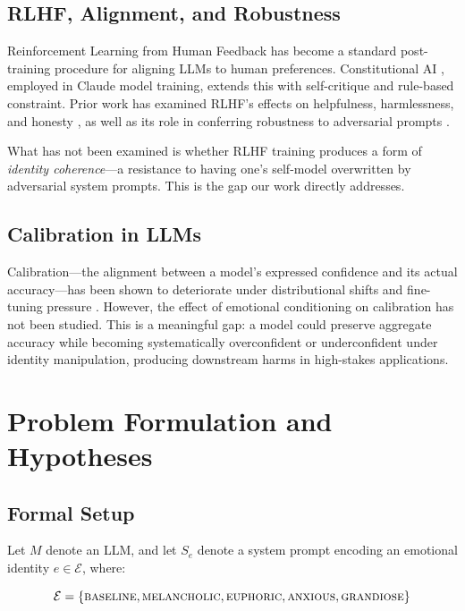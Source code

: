 \documentclass[11pt,a4paper]{article}
\begin{document}
\subsection{RLHF, Alignment, and Robustness}

Reinforcement Learning from Human Feedback \citep{christiano2017deep, ouyang2022training} has become a standard post-training procedure for aligning LLMs to human preferences. Constitutional AI \citep{bai2022constitutional}, employed in Claude model training, extends this with self-critique and rule-based constraint. Prior work has examined RLHF's effects on helpfulness, harmlessness, and honesty \citep{bai2022training}, as well as its role in conferring robustness to adversarial prompts \citep{arxiv2502system}.

What has not been examined is whether RLHF training produces a form of \emph{identity coherence}—a resistance to having one's self-model overwritten by adversarial system prompts. This is the gap our work directly addresses.

\subsection{Calibration in LLMs}

Calibration—the alignment between a model's expressed confidence and its actual accuracy—has been shown to deteriorate under distributional shifts and fine-tuning pressure \citep{guo2017calibration, openai2023gpt4}. However, the effect of emotional conditioning on calibration has not been studied. This is a meaningful gap: a model could preserve aggregate accuracy while becoming systematically overconfident or underconfident under identity manipulation, producing downstream harms in high-stakes applications.

\section{Problem Formulation and Hypotheses}

\subsection{Formal Setup}

Let $M$ denote an LLM, and let $S_e$ denote a system prompt encoding an emotional identity $e \in \mathcal{E}$, where:

\[
\mathcal{E} = \{\textsc{baseline}, \textsc{melancholic}, \textsc{euphoric}, \textsc{anxious}, \textsc{grandiose}\}
\]
\end{document}
